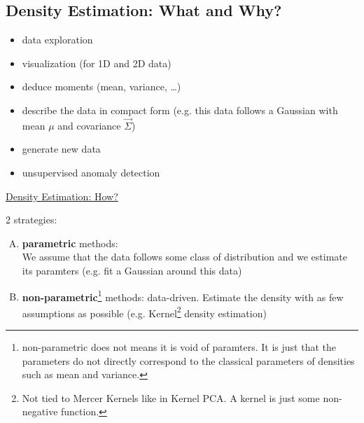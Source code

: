 \begin{frame}
\end{frame}

\begin{frame}

\section{Density Estimation: What and Why?}


\begin{itemize}
\item data exploration
\item visualization (for 1D and 2D data)
\item deduce moments (mean, variance, \ldots)
\item describe the data in compact form (e.g. this data follows a Gaussian with mean $\mu$ and covariance $\vec \Sigma$)
\item generate new data
\item unsupervised anomaly detection
\end{itemize}

\end{frame}

\begin{frame}

\underline{Density Estimation: How?}

2 strategies:

\begin{enumerate}[(A)]
\item \textbf{parametric} methods:
\\ We assume that the data follows some class of distribution and we estimate its paramters (e.g. fit a Gaussian around this data)
\item \textbf{non-parametric}\footnote{non-parametric does not means it is void of paramters. 
It is just that the parameters do not directly correspond to the classical parameters of densities such as mean and variance.} methods: 
data-driven. Estimate the density with as few assumptions as possible (e.g. Kernel\footnote{Not tied to Mercer Kernels like in Kernel PCA. A kernel is just some non-negative function.} density estimation)
\end{enumerate}

\end{frame}

